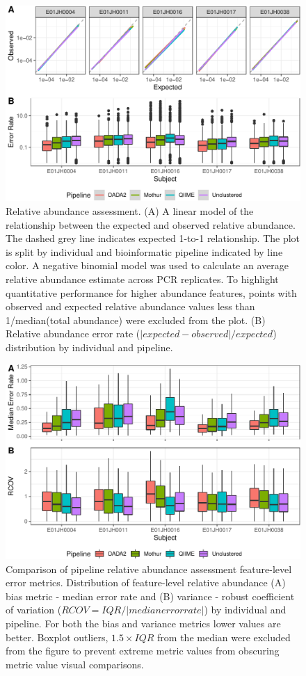 \documentclass{bmcart}
\begin{document}
\begin{figure}
\centering
\includegraphics{relAbuError-1.pdf}
\caption{\label{fig:relAbuError}Relative abundance assessment.
(A) A linear model of the relationship between the expected and observed relative
abundance. The dashed grey line indicates expected 1-to-1 relationship.
The plot is split by individual and bioinformatic pipeline indicated by
line color. A negative binomial model was used to
calculate an average relative abundance estimate across PCR
replicates. To highlight quantitative performance for higher abundance features,
points with observed and expected relative abundance values less
than 1/median(total abundance) were excluded from the plot.
(B) Relative abundance error rate (\(|expected - observed|/expected\))
distribution by individual and pipeline.}
\end{figure}

\begin{figure}
\centering
\includegraphics{relAbuErrorMetrics-1.pdf}
\caption{\label{fig:relAbuErrorMetrics}Comparison of pipeline relative
abundance assessment feature-level error metrics. Distribution of
feature-level relative abundance (A) bias metric - median error rate and
(B) variance - robust coefficient of variation (\(RCOV=IQR/|median error rate|\)) by individual and pipeline.
For both the bias and variance metrics lower values are better.
Boxplot outliers, \(1.5\times IQR\) from the median were excluded from the figure to prevent extreme metric values
from obscuring metric value visual comparisons.}
\end{figure}
\end{document}
